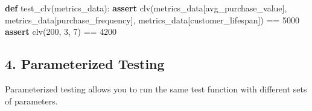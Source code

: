 \documentclass[
  letterpaper,
  DIV=11,
  numbers=noendperiod]{scrreprt}
\newenvironment{Shaded}{\begin{snugshade}}{\end{snugshade}}
\newcommand{\ControlFlowTok}[1]{\textcolor[rgb]{0.00,0.23,0.31}{\textbf{#1}}}
\newcommand{\DecValTok}[1]{\textcolor[rgb]{0.68,0.00,0.00}{#1}}
\newcommand{\KeywordTok}[1]{\textcolor[rgb]{0.00,0.23,0.31}{\textbf{#1}}}
\newcommand{\NormalTok}[1]{\textcolor[rgb]{0.00,0.23,0.31}{#1}}
\newcommand{\OperatorTok}[1]{\textcolor[rgb]{0.37,0.37,0.37}{#1}}
\newcommand{\StringTok}[1]{\textcolor[rgb]{0.13,0.47,0.30}{#1}}
\begin{document}
\begin{Shaded}
\begin{Highlighting}[]
\KeywordTok{def}\NormalTok{ test\_clv(metrics\_data):}
    \ControlFlowTok{assert}\NormalTok{ clv(metrics\_data[}\StringTok{\textquotesingle{}avg\_purchase\_value\textquotesingle{}}\NormalTok{], metrics\_data[}\StringTok{\textquotesingle{}purchase\_frequency\textquotesingle{}}\NormalTok{], metrics\_data[}\StringTok{\textquotesingle{}customer\_lifespan\textquotesingle{}}\NormalTok{]) }\OperatorTok{==} \DecValTok{5000}
    \ControlFlowTok{assert}\NormalTok{ clv(}\DecValTok{200}\NormalTok{, }\DecValTok{3}\NormalTok{, }\DecValTok{7}\NormalTok{) }\OperatorTok{==} \DecValTok{4200}
\end{Highlighting}
\end{Shaded}

\subsection{4. Parameterized Testing}\label{parameterized-testing}

Parameterized testing allows you to run the same test function with
different sets of parameters.
\end{document}
